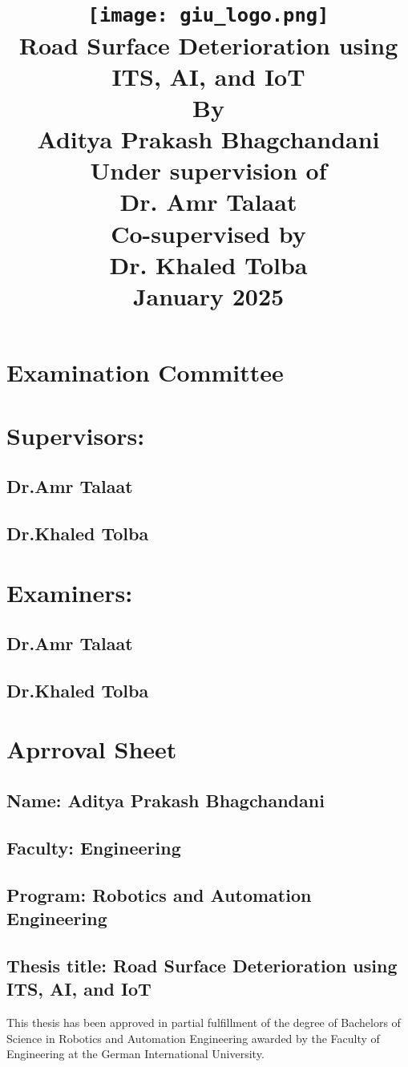 \documentclass[12pt,a4paper]{report}
\title{
    \texttt{[image: giu\_logo.png]}  
    \vspace{1cm} \\
    Road Surface Deterioration using ITS, AI, and IoT \\
    \vspace{1cm}
    \textbf{By} \\
    Aditya Prakash Bhagchandani \\
    \vspace{1cm}
    \textbf{Under supervision of} \\
    Dr. Amr Talaat \\
    \textbf{Co-supervised by} \\
    Dr. Khaled Tolba \\
    \vspace{1cm}
    January 2025
}
\author{}
\date{}
\begin{document}
\maketitle
\newpage
\section*{Examination Committee}
\vspace{2cm}
\section*{Supervisors:}
\vspace{0.2cm}
\subsection*{Dr.Amr Talaat}
\subsection*{Dr.Khaled Tolba}
\vspace{2cm}
\section*{Examiners:}
\vspace{0.5cm}
\subsection*{Dr.Amr Talaat}
\subsection*{Dr.Khaled Tolba}


\newpage
\section*{Aprroval Sheet}
\subsection*{Name: Aditya Prakash Bhagchandani}
\subsection*{Faculty: Engineering}
\subsection*{Program: Robotics and Automation Engineering}
\subsection*{Thesis title: Road Surface Deterioration using ITS, AI, and IoT}
\vspace{1cm}
\large This thesis has been approved in partial fulfillment of the degree of Bachelors of Science in
Robotics and Automation Engineering awarded by the Faculty of Engineering at the German International
University.
\vspace{1cm}
\end{document}
